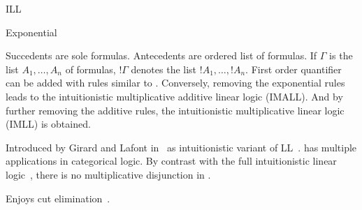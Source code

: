 \begin{entry}{ILL}
\begin{calculus}
\begin{infruleset}{Exponential}
  \sepproof
  \sepproof
  \sepproof
\end{infruleset}

\vspace{-1em}


\end{calculus}

\begin{clarifications}
  Succedents are sole formulas.
  Antecedents are ordered list of formulas.
  If $\Gamma$ is the list $A_1, \ldots, A_n$ of formulas, $!\Gamma$ denotes the list $!A_1, \ldots, !A_n$.
  First order quantifier can be added with rules similar to \LJ {}.
  Conversely, removing the exponential rules leads to the intuitionistic multiplicative additive linear logic (IMALL).
  And by further removing the additive rules, the intuitionistic multiplicative linear logic (IMLL) \cite{mints1977closed} is obtained.
\end{clarifications}

\begin{history}
  Introduced by Girard and Lafont in~\cite{lafont1987tapsoft} as intuitionistic variant of LL~.
  \ILL has multiple applications in categorical logic.
  By contrast with the full intuitionistic linear logic~, there is no multiplicative disjunction in \ILL.
\end{history}

\begin{technicalities}
  Enjoys cut elimination~\cite{lafont1987tapsoft}.
\end{technicalities}


\end{entry}

